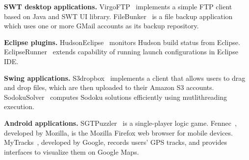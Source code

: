 \begin{itemize}
\Item \textbf{SWT desktop applications.}
VirgoFTP~\cite{virgo} implements a simple FTP client based on Java and SWT UI library.
FileBunker~\cite{filebunker} is a file backup application which uses one or more GMail accounts as its backup repository.

\Item \textbf{Eclipse plugins.}
HudsonEclipse~\cite{hudson} monitors Hudson build status from Eclipse.
EclipseRunner~\cite{eclipserunner} extends capability of running launch configurations in Eclipse IDE.

\Item \textbf{Swing applications.} %
S3dropbox~\cite{s3dropbox} implements a client that allows users
to drag and drop files, which are then uploaded to their Amazon S3 accounts. SodokuSolver~\cite{sudokusolver}
computes Sodoku solutions efficiently using mutlithreading execution. 

\Item  \textbf{Android applications.} %
SGTPuzzler~\cite{sgtpuzzles} is a single-player logic game.
Fennec~\cite{fennec}, developed by Mozilla, is the Mozilla
Firefox web browser for mobile devices. 
MyTracks~\cite{mytracks}, developed by Google, records users' GPS tracks, and provides
interfaces to visualize them on Google Maps. 

\end{itemize}


